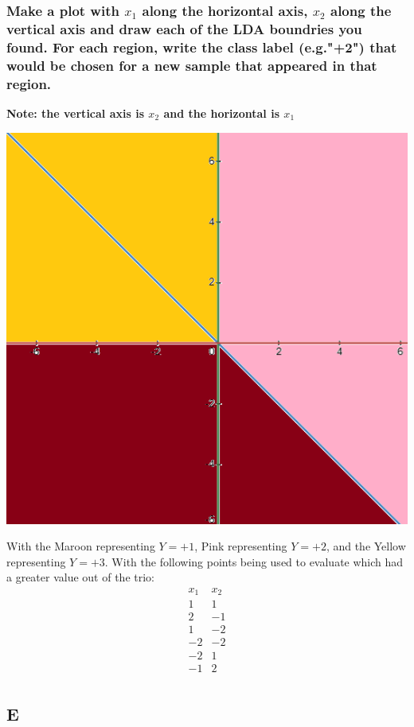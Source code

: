 \documentclass[12pt]{article}
\begin{document}
\subsubsection{Make a plot with $x_1$ along the horizontal axis, $x_2$ along the vertical axis and draw each of the LDA boundries you found. For each region, write the class label (e.g."+2") that would be chosen for a new sample that appeared in that region.}
\textbf{Note: the vertical axis is $x_2$ and the horizontal is $x_1$}
\begin{center}
    \includegraphics{p1.d.png}
\end{center}
With the Maroon representing $Y = +1$, Pink representing $Y = +2$, and the Yellow representing $Y= +3$.
With the following points being used to evaluate which had a greater value out of the trio:
\[\begin{matrix}
        x_1 & x_2 \\
        1   & 1   \\
        2   & -1  \\
        1   & -2  \\
        -2  & -2  \\
        -2  & 1   \\
        -1  & 2   \\
    \end{matrix}\]

\subsection{E}
\end{document}
